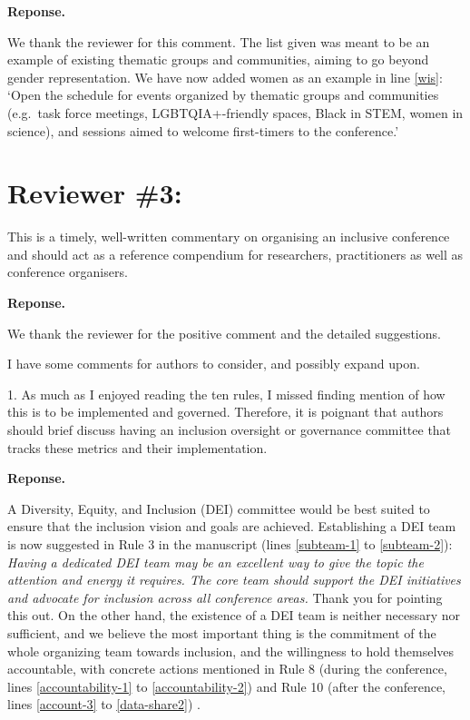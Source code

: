 \documentclass{article}
\newenvironment{Reply}{\noindent\color{BlueViolet}\textbf{Reponse.}}{\vspace{1em}}
\begin{document}
\begin{Reply}

    We thank the reviewer for this comment. The list given was meant to be an example of existing thematic groups and communities, aiming to go beyond gender representation.
    We have now added women as an example in line \ref{wis}:
    `Open the schedule for events organized by thematic groups and communities (e.g.\ task force meetings, LGBTQIA+-friendly spaces, Black in STEM, women in science), and sessions aimed to welcome first-timers to the conference.'
\end{Reply}

\section*{Reviewer \#3:} 
This is a timely, well-written commentary on organising an inclusive conference and should act as a reference compendium for researchers, practitioners as well as conference organisers.

\begin{Reply}

    We thank the reviewer for the positive comment and the detailed suggestions.
\end{Reply}

I have some comments for authors to consider, and possibly expand upon.

1. As much as I enjoyed reading the ten rules, I missed finding mention of how this is to be implemented and governed. Therefore, it is poignant that authors should brief discuss having an inclusion oversight or governance committee that tracks these metrics and their implementation.

\begin{Reply}

    A Diversity, Equity, and Inclusion (DEI) committee would be best suited to ensure that the inclusion vision and goals are achieved. 
    Establishing a DEI team is now suggested in Rule 3 in the manuscript (lines \ref{subteam-1} to \ref{subteam-2}):
    \textit{ 
    Having a dedicated DEI team may be an excellent way to give the topic the attention and energy it requires.
    The core team should support the DEI initiatives and advocate for inclusion across all conference areas.} 
    Thank you for pointing this out. 
    On the other hand, the existence of a DEI team is neither necessary nor sufficient, and we believe the most important thing is the commitment of the 
    whole organizing team towards inclusion, and the willingness to hold themselves accountable, with concrete actions mentioned in Rule 8 (during the conference, lines \ref{accountability-1} to \ref{accountability-2}) and Rule 10 (after the conference, lines \ref{account-3} to \ref{data-share2}) .
    
\end{Reply}
\end{document}

